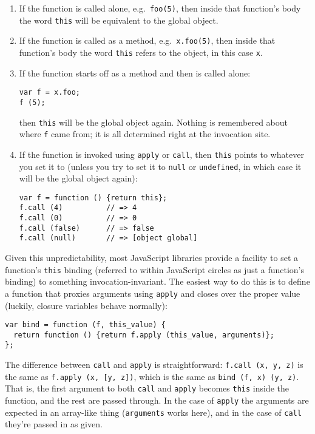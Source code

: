 \documentclass{article}
\begin{document}
\begin{enumerate}
\item If the function is called alone, e.g.~\verb|foo(5)|, then inside that function's body the word \verb|this| will be equivalent to the global object.
\item If the function is called as a method, e.g.~\verb|x.foo(5)|, then inside that function's body the word \verb|this| refers to the object, in this case \verb|x|.
\item If the function starts off as a method and then is called alone:

\begin{verbatim}
var f = x.foo;
f (5);
\end{verbatim}

        then \verb|this| will be the global object again. Nothing is remembered about where \verb|f| came from; it is all determined right at the invocation site. \label{itm:forget}

\item If the function is invoked using \verb|apply| or \verb|call|, then \verb|this| points to whatever you set it to (unless you try to set it to \verb|null| or \verb|undefined|, in
        which case it will be the global object again):

\begin{verbatim}
var f = function () {return this};
f.call (4)          // => 4
f.call (0)          // => 0
f.call (false)      // => false
f.call (null)       // => [object global]
\end{verbatim}
\end{enumerate}

    Given this unpredictability, most JavaScript libraries provide a facility to set a function's \verb|this| binding (referred to within JavaScript circles as just a function's binding)
    to something invocation-invariant. The easiest way to do this is to define a function that proxies arguments using \verb|apply| and closes over the proper value (luckily, closure
    variables behave normally):

\begin{verbatim}
var bind = function (f, this_value) {
  return function () {return f.apply (this_value, arguments)};
};
\end{verbatim}

    The difference between \verb|call| and \verb|apply| is straightforward: \verb|f.call (x, y, z)| is the same as \verb|f.apply (x, [y, z])|, which is the same as
    \verb|bind (f, x) (y, z)|. That is, the first argument to both \verb|call| and \verb|apply| becomes \verb|this| inside the function, and the rest are passed through. In the case of
    \verb|apply| the arguments are expected in an array-like thing (\verb|arguments| works here), and in the case of \verb|call| they're passed in as given.
\end{document}
